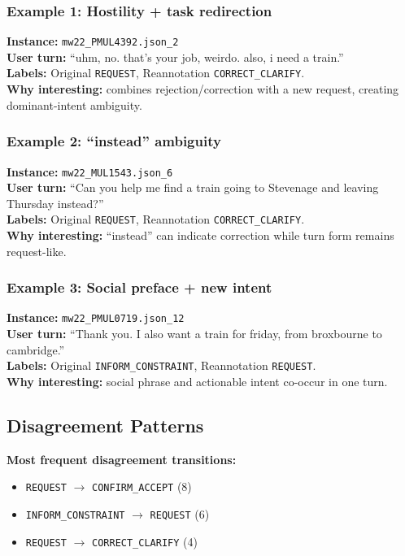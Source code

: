 \documentclass[11pt]{article}
\begin{document}
\subsubsection*{Example 1: Hostility + task redirection}
\textbf{Instance:} \texttt{mw22\_PMUL4392.json\_2}\\
\textbf{User turn:} ``uhm, no. that's your job, weirdo. also, i need a train.''\\
\textbf{Labels:} Original \texttt{REQUEST}, Reannotation \texttt{CORRECT\_CLARIFY}.\\
\textbf{Why interesting:} combines rejection/correction with a new request, creating dominant-intent ambiguity.

\subsubsection*{Example 2: ``instead'' ambiguity}
\textbf{Instance:} \texttt{mw22\_MUL1543.json\_6}\\
\textbf{User turn:} ``Can you help me find a train going to Stevenage and leaving Thursday instead?''\\
\textbf{Labels:} Original \texttt{REQUEST}, Reannotation \texttt{CORRECT\_CLARIFY}.\\
\textbf{Why interesting:} ``instead'' can indicate correction while turn form remains request-like.

\subsubsection*{Example 3: Social preface + new intent}
\textbf{Instance:} \texttt{mw22\_PMUL0719.json\_12}\\
\textbf{User turn:} ``Thank you. I also want a train for friday, from broxbourne to cambridge.''\\
\textbf{Labels:} Original \texttt{INFORM\_CONSTRAINT}, Reannotation \texttt{REQUEST}.\\
\textbf{Why interesting:} social phrase and actionable intent co-occur in one turn.

\subsection{Disagreement Patterns}
\textbf{Most frequent disagreement transitions:}
\begin{itemize}
  \item \texttt{REQUEST} $\rightarrow$ \texttt{CONFIRM\_ACCEPT} (8)
  \item \texttt{INFORM\_CONSTRAINT} $\rightarrow$ \texttt{REQUEST} (6)
  \item \texttt{REQUEST} $\rightarrow$ \texttt{CORRECT\_CLARIFY} (4)
\end{itemize}
\end{document}
